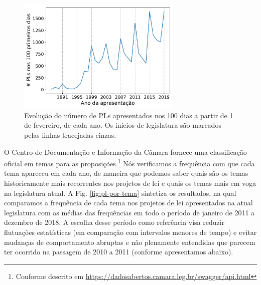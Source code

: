 \documentclass[12pt,a4paper]{article}
\begin{document}
\begin{figure}[t]
\centering
\includegraphics[width=0.7\textwidth]{graficos/PLs-por-ano_2019-05-01.pdf}
\caption{Evolução do número de PLs apresentados nos 100 dias a partir de 1 de fevereiro, de cada ano.
Os inícios de legislatura são marcados pelas linhas tracejadas cinzas.}
\label{fig:prop-por-ano}
\end{figure}

O Centro de Documentação e Informação da Câmara fornece uma classificação oficial em temas para as
proposições.\footnote{Conforme descrito em {\scriptsize\url{https://dadosabertos.camara.leg.br/swagger/api.html}}}
Nós verificamos a frequência com que cada tema apareceu em cada ano, de maneira que podemos saber
quais são os temas historicamente mais recorrentes nos projetos de lei e quais os temas mais em voga
na legislatura atual. A Fig. \ref{fig:pl-por-tema} sintetiza os resultados, na qual comparamos
a frequência de cada tema nos projetos de lei apresentados na atual legislatura com as médias das frequências
em todo o período de janeiro de 2011 a dezembro de 2018. A escolha desse período como referência
visa reduzir flutuações estatísticas (em comparação com intervalos menores de tempo) e evitar mudanças 
de comportamento abruptas e não plenamente entendidas que parecem ter ocorrido na passagem de 2010 a 2011
(conforme apresentamos abaixo).
\end{document}
